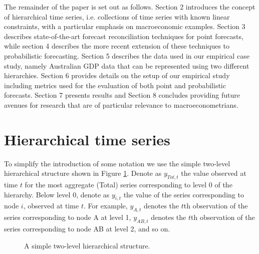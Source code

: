 \documentclass[graybox]{svmult}
\begin{document}
The remainder of the paper is set out as follows.  Section 2 introduces the concept of hierarchical time series, i.e. collections of time series with known linear constraints, with a particular emphasis on macroeconomic examples. Section 3 describes state-of-the-art forecast reconciliation techniques for point forecasts, while section 4 describes the more recent extension of these techniques to probabilistic forecasting.  Section 5 describes the data used in our empirical case study, namely Australian GDP data that can be represented using two different hierarchies.  Section 6 provides details on the setup of our empirical study including metrics used for the evaluation of both point and probabilistic forecasts.  Section 7 presents results and Section 8 concludes providing future avenues for research that are of particular relevance to macroeconometrians.

\section{Hierarchical time series}\label{sec:Hier ts}

To simplify the introduction of some notation we use the simple two-level hierarchical structure shown in Figure \ref{fig:simple tree}. Denote as $y_{Tot,t}$ the value observed at time $t$ for the most aggregate (Total) series  corresponding to level 0 of the hierarchy. Below level 0, denote as $y_{i,t}$ the value of the series corresponding to node $i$, observed at time $t$. For example, $y_{A,t}$ denotes the $t$th observation of the series corresponding to node A at level 1, $y_{AB,t}$ denotes the $t$th observation of the series corresponding to node AB at level 2, and so on.

\begin{figure}[!hbt]  \center
  \caption{A simple two-level hierarchical structure.}
  \label{fig:simple tree}
\end{figure}
\end{document}
